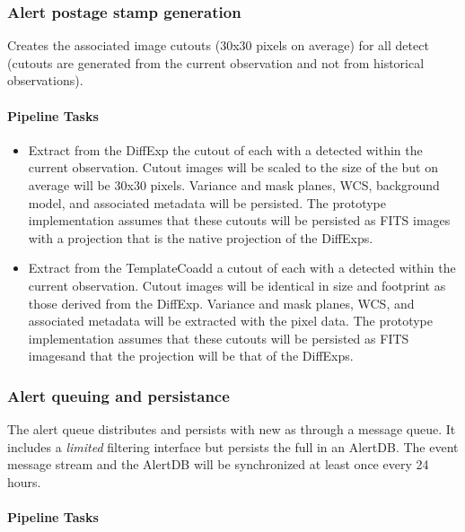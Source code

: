 \subsubsection{Alert postage stamp generation}

Creates the associated image cutouts (30x30 pixels on average) for all detect \DIAObjects (cutouts are generated from the current observation and not from historical observations).

\paragraph{Pipeline Tasks}

 \begin{itemize}
\item Extract from the DiffExp the cutout of each \DIAObject with a \DIASource detected within the current observation.  Cutout images will be scaled to the size of the \DIASource but on average will be 30x30 pixels. Variance and mask planes, WCS, background model, and associated metadata will be persisted. The prototype implementation assumes that these cutouts will be persisted as FITS images with a projection that is the  native projection of the DiffExps.

\item Extract from the TemplateCoadd  a cutout of each \DIAObject with a \DIASource detected within the current observation.  Cutout images will be identical in size and footprint as those derived from the DiffExp. Variance and mask planes, WCS, and associated metadata will be extracted with the pixel data. The prototype implementation assumes that these cutouts will be persisted as FITS imagesand that the projection will be that of  the DiffExps.
\end{itemize}

\subsubsection{Alert queuing and persistance}
\label{sec:apQueue}

The alert queue  distributes and persists \DIAObject with new \DIASources as \VOEvents through a message queue. It includes a \textit{limited} filtering interface but persists the full \VOEvents in an AlertDB. The event message stream and the AlertDB will be  synchronized at least once every 24 hours.


\paragraph{Pipeline Tasks}

